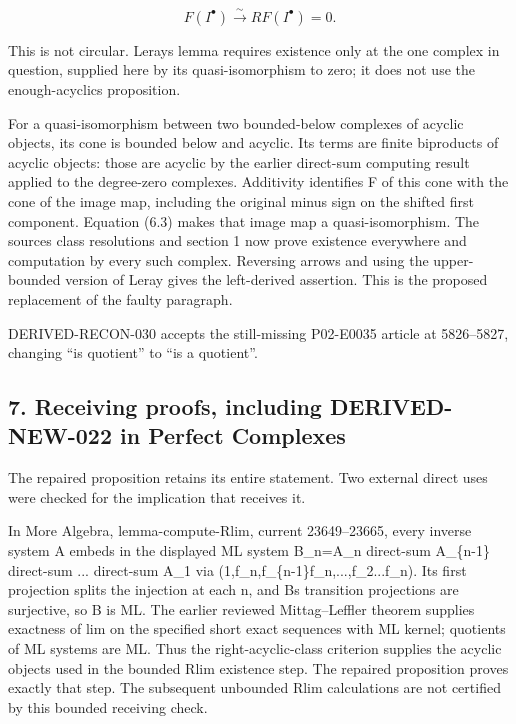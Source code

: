 \[
 F(I^\bullet)\xrightarrow{\sim}RF(I^\bullet)=0.             \tag{6.3}
\]

This is not circular. Leray\textquotesingle s lemma requires existence only at the one complex in question,\allowbreak{} supplied here by its quasi-isomorphism to zero; it does not use the enough-acyclics proposition.

For a quasi-isomorphism between two bounded-below complexes of acyclic objects,\allowbreak{} its cone is bounded below and acyclic. Its terms are finite biproducts of acyclic objects:\allowbreak{} those are acyclic by the earlier direct-sum computing result applied to the degree-zero complexes. Additivity identifies F of this cone with the cone of the image map,\allowbreak{} including the original minus sign on the shifted first component. Equation (6.3)\allowbreak{} makes that image map a quasi-isomorphism. The source\textquotesingle s class resolutions and section 1 now prove existence everywhere and computation by every such complex. Reversing arrows and using the upper-bounded version of Leray gives the left-derived assertion. This is the proposed replacement of the faulty paragraph.

DERIVED-RECON-030 accepts the still-missing P02-E0035 article at 5826–\allowbreak{}5827,\allowbreak{} changing ``is quotient'' to ``is a quotient''.

\subsection{\texorpdfstring{7. Receiving proofs,\allowbreak{} including DERIVED-NEW-022 in Perfect Complexes}{7. Receiving  including DERIVED-NEW-022 in Perfect Complexes}}\label{proofs-5091-5900-receiving-proofs-including-derived-new-022-in-perfect-complexes}

The repaired proposition retains its entire statement. Two external direct uses were checked for the implication that receives it.

In More Algebra,\allowbreak{} lemma-compute-Rlim,\allowbreak{} current 23649–\allowbreak{}23665,\allowbreak{} every inverse system A embeds in the displayed ML system B\_\allowbreak{}n\allowbreak{}=A\_\allowbreak{}n direct-sum A\_\allowbreak{}\{n-1\} direct-sum ... direct-sum A\_\allowbreak{}1 via (1,\allowbreak{}f\_\allowbreak{}n,\allowbreak{}f\_\allowbreak{}\{n-1\}f\_\allowbreak{}n,\allowbreak{}...,\allowbreak{}f\_\allowbreak{}2...f\_\allowbreak{}n)\allowbreak{}. Its first projection splits the injection at each n,\allowbreak{} and B\textquotesingle s transition projections are surjective,\allowbreak{} so B is ML. The earlier reviewed Mittag–\allowbreak{}Leffler theorem supplies exactness of lim on the specified short exact sequences with ML kernel; quotients of ML systems are ML. Thus the right-acyclic-class criterion supplies the acyclic objects used in the bounded Rlim existence step. The repaired proposition proves exactly that step. The subsequent unbounded Rlim calculations are not certified by this bounded receiving check.

